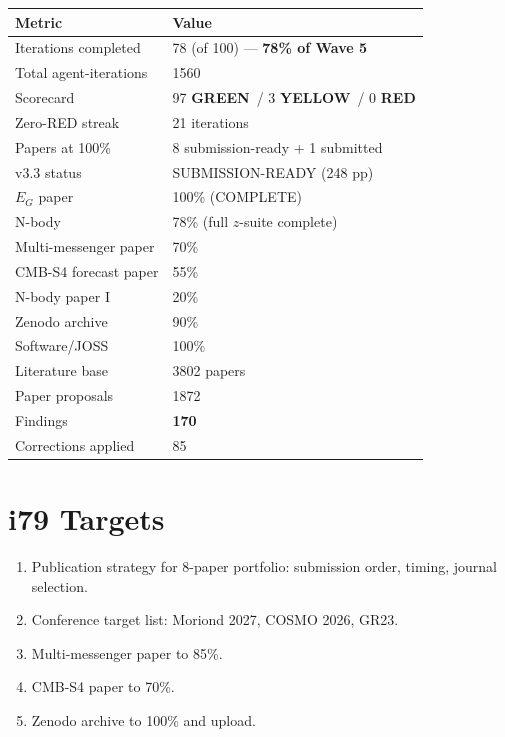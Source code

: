 \documentclass[11pt,a4paper]{article}
\newcommand{\GREEN}{\textcolor{dfdgreen}{\textbf{GREEN}}}
\newcommand{\YELLOW}{\textcolor{dfdyellow}{\textbf{YELLOW}}}
\newcommand{\RED}{\textcolor{dfdred}{\textbf{RED}}}
\begin{document}
\begin{center}
\begin{tabular}{ll}
\toprule
\textbf{Metric} & \textbf{Value} \\
\midrule
Iterations completed & 78 (of 100) --- \textbf{78\% of Wave 5} \\
Total agent-iterations & 1560 \\
Scorecard & 97 \GREEN\ / 3 \YELLOW\ / 0 \RED \\
Zero-RED streak & 21 iterations \\
Papers at 100\% & 8 submission-ready + 1 submitted \\
v3.3 status & SUBMISSION-READY (248 pp) \\
$E_G$ paper & 100\% (COMPLETE) \\
N-body & 78\% (full $z$-suite complete) \\
Multi-messenger paper & 70\% \\
CMB-S4 forecast paper & 55\% \\
N-body paper I & 20\% \\
Zenodo archive & 90\% \\
Software/JOSS & 100\% \\
Literature base & 3802 papers \\
Paper proposals & 1872 \\
Findings & \textbf{170} \\
Corrections applied & 85 \\
\bottomrule
\end{tabular}
\end{center}

\section{i79 Targets}

\begin{enumerate}[nosep]
\item Publication strategy for 8-paper portfolio: submission order, timing, journal selection.
\item Conference target list: Moriond 2027, COSMO 2026, GR23.
\item Multi-messenger paper to 85\%.
\item CMB-S4 paper to 70\%.
\item Zenodo archive to 100\% and upload.
\end{enumerate}
\end{document}
